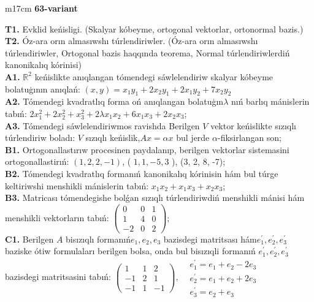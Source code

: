 \documentclass{article}
\begin{document}
\begin{tabular}{m{17cm}}
\textbf{63-variant}
\newline

\textbf{T1.} Evklid keńisligi. (Skalyar kóbeyme, ortogonal vektorlar, ortonormal bazis.) \\
\textbf{T2.} Óz-ara orın almasıwshı túrlendiriwler. (Óz-ara orın almasıwshı túrlendiriwler,  Ortogonal bazis haqqında teorema,  Normal túrlendiriwlerdiń kanonikalıq kórinisi) \\
\textbf{A1.} \(\mathbb{R}^{2}\) keńislikte anıqlangan tómendegi sáwlelendiriw skalyar kóbeyme bolatuģının anıqlań: \((x,y) = x_{1}y_{1} + 2x_{2}y_{1} + 2x_{1}y_{2} + 7x_{2}y_{2}\) \\
\textbf{A2.} Tómendegi kvadratlıq forma oń anıqlangan bolatuģın\(\lambda\) nıń barlıq mánislerin tabıń: \(2x_{1}^{2} + 2x_{2}^{2} + x_{3}^{2} + 2\lambda x_{1}x_{2} + 6x_{1}x_{3} + 2x_{2}x_{3}\); \\
\textbf{A3.} Tómendegi sáwlelendiriwmos ravishda Berilgen \(V\) vektor keńislikte sızıqlı túrlendiriw boladı: \(V\) sızıqlı keńislik,\(Ax = \alpha x\) bul jerde \(\alpha\)-fiksirlangan son; \\
\textbf{B1.} Ortogonallastırıw procesinen paydalanıp, berilgen vektorlar sistemasini ortogonallastirıń: \((1,2,2, - 1)\), ( \(1,1, - 5,3\) ), (3, 2, 8, -7); \\
\textbf{B2.} Tómendegi kvadratlıq formanıń kanonikalıq kórinisin hám bul túrge keltiriwshi menshikli mánislerin tabıń: \(x_{1}x_{2} + x_{1}x_{3} + x_{2}x_{3}\); \\
\textbf{B3.} Matricası tómendegishe bolǵan sızıqlı túrlendiriwdiń menshikli mánisi hám menshikli vektorların tabıń: \(\begin{pmatrix} 0 & 0 & 1 \\ 1 & 4 & 0 \\  - 2 & 0 & 2 \end{pmatrix}\); \\
\textbf{C1.} Berilgen \(A\) bisızıqlı formanıń\(e_{1},e_{2},e_{3}\) bazisdegi matritsası hám\(e_{1}^{'},e_{2}^{'},e_{3}^{'}\) baziske ótiw formulaları berilgen bolsa, onda bul bisızıqli formanıń \(e_{1}^{'},e_{2}^{'},e_{3}^{'}\) bazisdegi matritsasini tabıń: \(\begin{pmatrix} 1 & 1 & 2 \\  - 1 & 2 & 1 \\  - 1 & 1 & - 1 \end{pmatrix},\begin{matrix}  & e_{1}^{'} = e_{1} + e_{2} - 2e_{3} \\  & e_{2}^{'} = e_{1} + e_{2} + 2e_{3} \\  & e_{3}^{'} = e_{2} + e_{3} \end{matrix}\) \\

\end{tabular}
\end{document}
